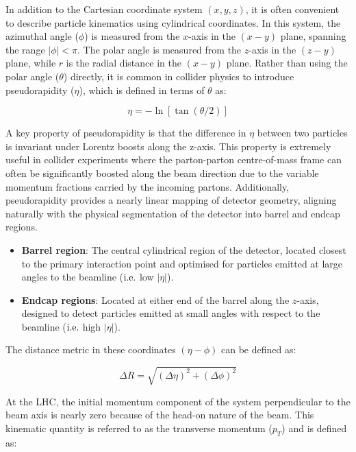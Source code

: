 In addition to the Cartesian coordinate system $(x,y,z)$, it is often convenient to describe particle kinematics using cylindrical coordinates. In this system, the azimuthal angle ($\phi$) is measured from the $x$-axis in the $(x-y)$ plane, spanning the range $|\phi| < \pi$. The polar angle is measured from the $z$-axis in the $(z-y)$ plane, while $r$ is the radial distance in the $(x-y)$ plane. Rather than using the polar angle ($\theta$) directly, it is common in collider physics to introduce pseudorapidity ($\eta$), which is defined in terms of $\theta$ as:

\begin{equation}
    \eta = - \ln[\tan(\theta/2)]
\end{equation}

A key property of pseudorapidity is that the difference in $\eta$ between two particles is invariant under Lorentz boosts along the z-axis. This property is extremely useful in collider experiments where the parton-parton centre-of-mass frame can often be significantly boosted along the beam direction due to the variable momentum fractions carried by the incoming partons. Additionally, pseudorapidity provides a nearly linear mapping of detector geometry, aligning naturally with the physical segmentation of the detector into barrel and endcap regions.

\begin{itemize} 
\item \textbf{Barrel region}: The central cylindrical region of the detector, located closest to the primary interaction point and optimised for particles emitted at large angles to the beamline ($\mbox{i.e.}$ low $|\eta|$). 
\item \textbf{Endcap regions}: Located at either end of the barrel along the $z$-axis, designed to detect particles emitted at small angles with respect to the beamline ($\mbox{i.e.}$ high $|\eta|$). 
\end{itemize}

The distance metric in these coordinates $(\eta-\phi)$ can be defined as:

\begin{equation}
    \Delta R = \sqrt{(\Delta\eta)^2 + (\Delta \phi)^2}
\end{equation}

At the LHC, the initial momentum component of the system perpendicular to the beam axis is nearly zero because of the head-on nature of the beam. This kinematic quantity is referred to as the transverse momentum ($p_T$) and is defined as:

